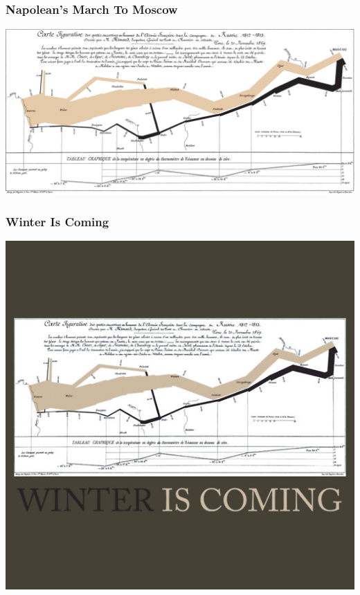 \documentclass{beamer} %
\begin{document}
\begin{frame}\frametitle{Napolean's March To Moscow}
		\centering
	\includegraphics[width=\linewidth]{Minard.png}
	
\end{frame}


\begin{frame}\frametitle{Winter Is Coming}
		\centering
	\includegraphics[width=0.9\linewidth]{winteriscoming.jpg}
\end{frame}
\end{document}
